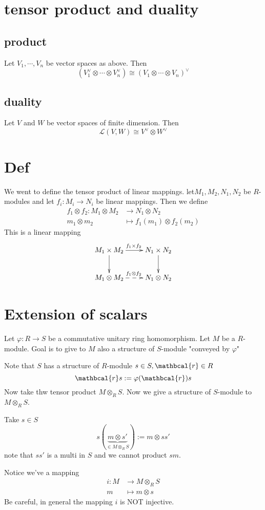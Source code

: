 \documentclass{article}
\begin{document}
\section{tensor product and duality}
\subsection{product}
Let $V_1,\cdots,V_n$ be vector spaces as above. Then $$(V_1^\vee\otimes\cdots\otimes V_n^\vee)\cong(V_1\otimes\cdots\otimes V_n)^\vee$$
\subsection{duality}
Let $V$ and $W$ be vector spaces of finite dimension. Then 
$$\mathscr{L}(V,W)\cong V^\vee\otimes W^\vee$$
\section{Def}
We went to define the tensor product of linear mappings. let$M_1,M_2,N_1,N_2$ be $R$-modules and let $f_i:M_i\rightarrow N_i$ be linear mappings. Then we define $$
\begin{aligned}
    f_1\otimes f_2:M_1\otimes M_2 &\rightarrow N_1\otimes N_2\\
    m_1\otimes m_2 &\mapsto f_1(m_1)\otimes f_2(m_2)
\end{aligned}
$$
This is a linear mapping
$$\xymatrix{
    M_1\times M_2\ar[d]\ar[r]^{f_1\times f_2}& N_1\times N_2\ar[d]\\
    M_1\otimes M_2 \ar@{-->}^{f_1\otimes f_2}[r] &N_1\otimes N_2
}$$
\section{Extension of scalars}
Let $\varphi:R\rightarrow S$ be a commutative unitary ring homomorphism. Let $M$ be a $R$-module. Goal is to give to $M$ also a structure of $S$-module "conveyed by $\varphi$"

Note that $S$ has a structure of $R$-module $s\in S,\mathbcal{r}\in R$$$\mathbcal{r}s:=\varphi(\mathbcal{r})s$$
Now take thw tensor product $M\otimes_RS$. Now we give a structure of $S$-module to $M\otimes_RS$. 

Take $s\in S$$$s(\underbrace{m\otimes s'}\limits_{\in M\otimes_RS}):=m\otimes ss'$$
note that $ss'$ is a multi in $S$ and we cannot product $sm$.

Notice we've a mapping
$$\begin{aligned}
    i: M&\rightarrow M\otimes_RS\\
    m &\mapsto m\otimes s
\end{aligned}$$
Be careful, in general the mapping $i$ is NOT injective.
\end{document}
